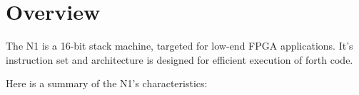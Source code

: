 
\section{Overview}
\label{overview}

The N1 is a 16-bit stack machine, targeted for low-end FPGA applications.
It's instruction set and architecture is designed for efficient execution
of \Gls{forth} code. 

\noindent
Here is a summary of the N1's characteristics:

